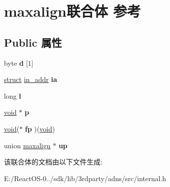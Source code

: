 \hypertarget{unionmaxalign}{}\section{maxalign联合体 参考}
\label{unionmaxalign}
\subsection*{Public 属性}
\begin{DoxyCompactItemize}
\item 
\mbox{\label{unionmaxalign_a3059298a426e42531c75bf354839f9ed}} 
byte {\bfseries d} \mbox{[}1\mbox{]}
\item 
\mbox{\label{unionmaxalign_ab208202ce2410ffe87e7266134145010}} 
\hyperlink{interfacestruct}{struct} \hyperlink{structin__addr}{in\+\_\+addr} {\bfseries ia}
\item 
\mbox{\label{unionmaxalign_a44e8d1508a6ea9f58a0956602f055080}} 
long {\bfseries l}
\item 
\mbox{\label{unionmaxalign_a423a583d62fc3c5258b7e425a52d3718}} 
\hyperlink{interfacevoid}{void} $\ast$ {\bfseries p}
\item 
\mbox{\label{unionmaxalign_a815523b5fd5b853847c1ff9cb306afee}} 
\hyperlink{interfacevoid}{void}($\ast$ {\bfseries fp} )(\hyperlink{interfacevoid}{void})
\item 
\mbox{\label{unionmaxalign_aed85e0fc216a449c41b90d2cbb13e977}} 
union \hyperlink{unionmaxalign}{maxalign} $\ast$ {\bfseries up}
\end{DoxyCompactItemize}


该联合体的文档由以下文件生成\+:\begin{DoxyCompactItemize}
\item 
E\+:/\+React\+O\+S-\/0../sdk/lib/3rdparty/adns/src/internal.\+h\end{DoxyCompactItemize}
